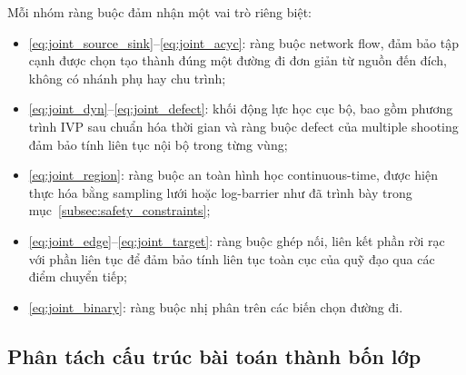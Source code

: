 Mỗi nhóm ràng buộc đảm nhận một vai trò riêng biệt:
\begin{itemize}
    \item \eqref{eq:joint_source_sink}--\eqref{eq:joint_acyc}: ràng buộc network flow, đảm bảo tập cạnh được chọn tạo thành đúng một đường đi đơn giản từ nguồn đến đích, không có nhánh phụ hay chu trình;
    \item \eqref{eq:joint_dyn}--\eqref{eq:joint_defect}: khối động lực học cục bộ, bao gồm phương trình IVP sau chuẩn hóa thời gian và ràng buộc defect của multiple shooting đảm bảo tính liên tục nội bộ trong từng vùng;
    \item \eqref{eq:joint_region}: ràng buộc an toàn hình học continuous-time, được hiện thực hóa bằng sampling lưới hoặc log-barrier như đã trình bày trong mục~\ref{subsec:safety_constraints};
    \item \eqref{eq:joint_edge}--\eqref{eq:joint_target}: ràng buộc ghép nối, liên kết phần rời rạc với phần liên tục để đảm bảo tính liên tục toàn cục của quỹ đạo qua các điểm chuyển tiếp;
    \item \eqref{eq:joint_binary}: ràng buộc nhị phân trên các biến chọn đường đi.
\end{itemize}

\subsection{Phân tách cấu trúc bài toán thành bốn lớp}
\label{subsec:layered_decomposition}

